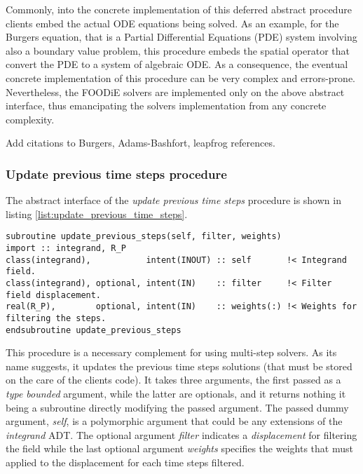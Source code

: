 \documentclass[pdftex,preprint,3p,times,numbers]{elsarticle}
\begin{document}
Commonly, into the concrete implementation of this deferred abstract procedure clients embed the actual ODE equations being solved. As an example, for the Burgers equation, that is a Partial Differential Equations (PDE) system involving also a boundary value problem, this procedure embeds the spatial operator that convert the PDE to a system of algebraic ODE. As a consequence, the eventual concrete implementation of this procedure can be very complex and errors-prone. Nevertheless, the FOODiE solvers are implemented only on the above abstract interface, thus emancipating the solvers implementation from any concrete complexity.

{\color{red} Add citations to Burgers, Adams-Bashfort, leapfrog references.}

\subsubsection{Update previous time steps procedure}

The abstract interface of the \emph{update previous time steps} procedure is shown in listing \ref{list:update_previous_time_steps}.

\begin{lstlisting}[firstnumber=1,style=code,caption={update previous time steps procedure interface},label={list:update_previous_time_steps}]
subroutine update_previous_steps(self, filter, weights)
import :: integrand, R_P
class(integrand),           intent(INOUT) :: self       !< Integrand field.
class(integrand), optional, intent(IN)    :: filter     !< Filter field displacement.
real(R_P),        optional, intent(IN)    :: weights(:) !< Weights for filtering the steps.
endsubroutine update_previous_steps
\end{lstlisting}

This procedure is a necessary complement for using multi-step solvers. As its name suggests, it updates the previous time steps solutions (that must be stored on the care of the clients code). It takes three arguments, the first passed as a \emph{type bounded} argument, while the latter are optionals, and it returns nothing it being a subroutine directly modifying the passed argument. The passed dummy argument, \emph{self}, is a polymorphic argument that could be any extensions of the \emph{integrand} ADT. The optional argument \emph{filter} indicates a \emph{displacement} for filtering the field while the last optional argument \emph{weights} specifies the weights that must applied to the displacement for each time steps filtered.
\end{document}
